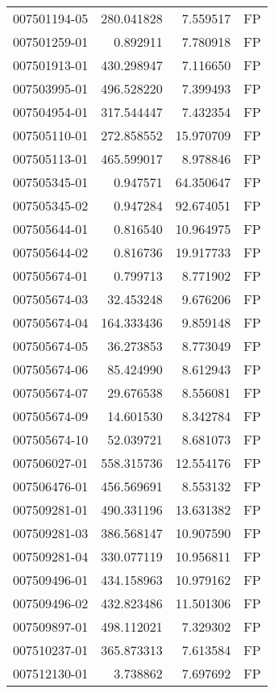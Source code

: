 \begin{tabular}{lrrl}
007501194-05 &  280.041828 &     7.559517 &   FP \\
007501259-01 &    0.892911 &     7.780918 &   FP \\
007501913-01 &  430.298947 &     7.116650 &   FP \\
007503995-01 &  496.528220 &     7.399493 &   FP \\
007504954-01 &  317.544447 &     7.432354 &   FP \\
007505110-01 &  272.858552 &    15.970709 &   FP \\
007505113-01 &  465.599017 &     8.978846 &   FP \\
007505345-01 &    0.947571 &    64.350647 &   FP \\
007505345-02 &    0.947284 &    92.674051 &   FP \\
007505644-01 &    0.816540 &    10.964975 &   FP \\
007505644-02 &    0.816736 &    19.917733 &   FP \\
007505674-01 &    0.799713 &     8.771902 &   FP \\
007505674-03 &   32.453248 &     9.676206 &   FP \\
007505674-04 &  164.333436 &     9.859148 &   FP \\
007505674-05 &   36.273853 &     8.773049 &   FP \\
007505674-06 &   85.424990 &     8.612943 &   FP \\
007505674-07 &   29.676538 &     8.556081 &   FP \\
007505674-09 &   14.601530 &     8.342784 &   FP \\
007505674-10 &   52.039721 &     8.681073 &   FP \\
007506027-01 &  558.315736 &    12.554176 &   FP \\
007506476-01 &  456.569691 &     8.553132 &   FP \\
007509281-01 &  490.331196 &    13.631382 &   FP \\
007509281-03 &  386.568147 &    10.907590 &   FP \\
007509281-04 &  330.077119 &    10.956811 &   FP \\
007509496-01 &  434.158963 &    10.979162 &   FP \\
007509496-02 &  432.823486 &    11.501306 &   FP \\
007509897-01 &  498.112021 &     7.329302 &   FP \\
007510237-01 &  365.873313 &     7.613584 &   FP \\
007512130-01 &    3.738862 &     7.697692 &   FP \\

\end{tabular}

